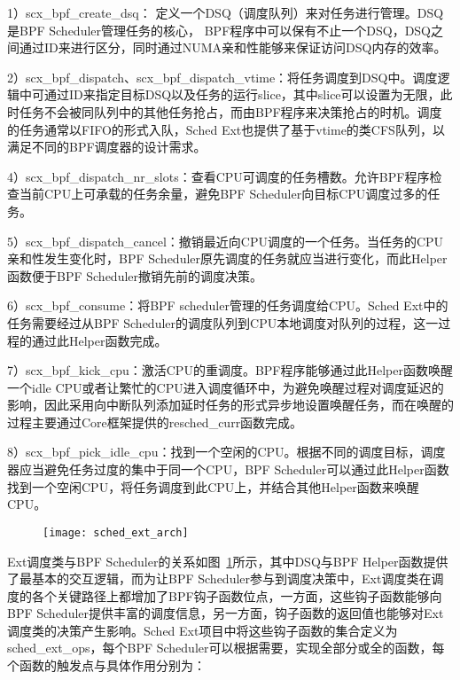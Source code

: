 1）scx\_bpf\_create\_dsq： 定义一个DSQ（调度队列）来对任务进行管理。DSQ是BPF Scheduler管理任务的核心， BPF程序中可以保有不止一个DSQ，DSQ之间通过ID来进行区分，同时通过NUMA亲和性能够来保证访问DSQ内存的效率。

2）scx\_bpf\_dispatch、scx\_bpf\_dispatch\_vtime：将任务调度到DSQ中。调度逻辑中可通过ID来指定目标DSQ以及任务的运行slice，其中slice可以设置为无限，此时任务不会被同队列中的其他任务抢占，而由BPF程序来决策抢占的时机。调度的任务通常以FIFO的形式入队，Sched Ext也提供了基于vtime的类CFS队列，以满足不同的BPF调度器的设计需求。

4）scx\_bpf\_dispatch\_nr\_slots：查看CPU可调度的任务槽数。允许BPF程序检查当前CPU上可承载的任务余量，避免BPF Scheduler向目标CPU调度过多的任务。

5）scx\_bpf\_dispatch\_cancel：撤销最近向CPU调度的一个任务。当任务的CPU亲和性发生变化时，BPF Scheduler原先调度的任务就应当进行变化，而此Helper函数便于BPF Scheduler撤销先前的调度决策。

6）scx\_bpf\_consume：将BPF scheduler管理的任务调度给CPU。Sched Ext中的任务需要经过从BPF Scheduler的调度队列到CPU本地调度对队列的过程，这一过程的通过此Helper函数完成。

7）scx\_bpf\_kick\_cpu：激活CPU的重调度。BPF程序能够通过此Helper函数唤醒一个idle CPU或者让繁忙的CPU进入调度循环中，为避免唤醒过程对调度延迟的影响，因此采用向中断队列添加延时任务的形式异步地设置唤醒任务，而在唤醒的过程主要通过Core框架提供的resched\_curr函数完成。

8）scx\_bpf\_pick\_idle\_cpu：找到一个空闲的CPU。根据不同的调度目标，调度器应当避免任务过度的集中于同一个CPU，BPF Scheduler可以通过此Helper函数找到一个空闲CPU，将任务调度到此CPU上，并结合其他Helper函数来唤醒CPU。

\begin{figure}[!htbp]
    \centering
    \texttt{[image: sched\_ext\_arch]}
    \label{fig:sched_ext_arch}
\end{figure}

Ext调度类与BPF Scheduler的关系如图~\ref{fig:sched_ext_arch}所示，其中DSQ与BPF Helper函数提供了最基本的交互逻辑，而为让BPF Scheduler参与到调度决策中，Ext调度类在调度的各个关键路径上都增加了BPF钩子函数位点，一方面，这些钩子函数能够向BPF Scheduler提供丰富的调度信息，另一方面，钩子函数的返回值也能够对Ext调度类的决策产生影响。Sched Ext项目中将这些钩子函数的集合定义为sched\_ext\_ops，每个BPF Scheduler可以根据需要，实现全部分或全的函数，每个函数的触发点与具体作用分别为：

